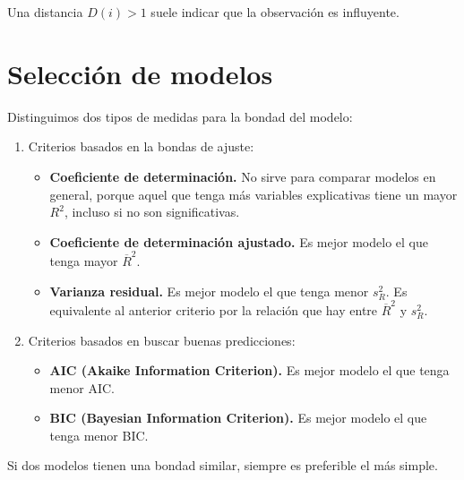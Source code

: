 \begin{obs}
    Una distancia $D(i) > 1$ suele indicar que la observación es influyente.
\end{obs}

\section{Selección de modelos}
\noindent Distinguimos dos tipos de medidas para la bondad del modelo:
\begin{enumerate}
    \item Criterios basados en la bondas de ajuste:
          \begin{itemize}
              \item \textbf{Coeficiente de determinación.}
                    No sirve para comparar modelos en general, porque aquel que tenga más variables explicativas tiene un mayor $R^2$, incluso si no son significativas.
              \item \textbf{Coeficiente de determinación ajustado.}
                    Es mejor modelo el que tenga mayor $\overline{R}^2$.
              \item \textbf{Varianza residual.}
                    Es mejor modelo el que tenga menor $s_R^2$.
                    Es equivalente al anterior criterio por la relación que hay entre $\overline{R}^2$ y $s_R^2$.
          \end{itemize}
    \item Criterios basados en buscar buenas predicciones:
          \begin{itemize}
              \item \textbf{AIC (Akaike Information Criterion).}
                    Es mejor modelo el que tenga menor AIC.
              \item \textbf{BIC (Bayesian Information Criterion).}
                    Es mejor modelo el que tenga menor BIC.
          \end{itemize}
\end{enumerate}

\noindent Si dos modelos tienen una bondad similar, siempre es preferible el más simple.

